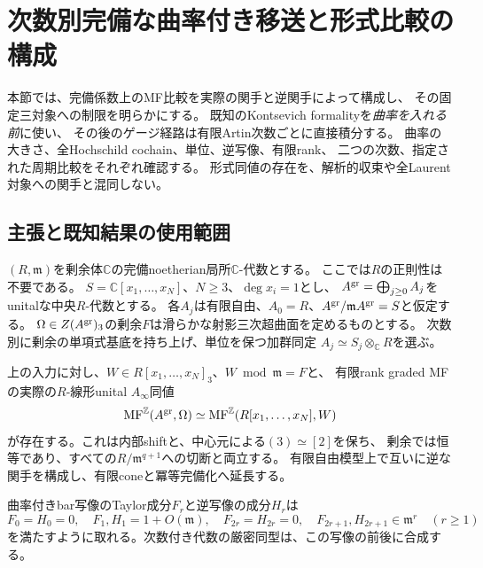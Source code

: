 \section{次数別完備な曲率付き移送と形式比較の構成}
\label{cft:sec:transport}

本節では、完備係数上のMF比較を実際の関手と逆関手によって構成し、
その固定三対象への制限を明らかにする。
既知のKontsevich formalityを\emph{曲率を入れる前}に使い、
その後のゲージ経路は有限Artin次数ごとに直接積分する。
曲率の大きさ、全Hochschild cochain、単位、逆写像、有限rank、
二つの次数、指定された周期比較をそれぞれ確認する。
形式同値の存在を、解析的収束や全Laurent対象への関手と混同しない。

\subsection{主張と既知結果の使用範囲}
$(R,\mathfrak m)$を剰余体$\mathbb C$の完備noetherian局所$\mathbb C$-代数とする。
ここでは$R$の正則性は不要である。
$S=\mathbb C[x_1,\ldots,x_N]$、$N\ge3$、$\deg x_i=1$とし、
$A^{\rm gr}=\bigoplus_{j\ge0}A_j$をunitalな中央$R$-代数とする。
各$A_j$は有限自由、$A_0=R$、$A^{\rm gr}/\mathfrak m A^{\rm gr}=S$と仮定する。
$\Omega\in Z(A^{\rm gr})_3$の剰余$F$は滑らかな射影三次超曲面を定めるものとする。
次数別に剰余の単項式基底を持ち上げ、単位を保つ加群同定
$A_j\simeq S_j\otimes_{\mathbb C}R$を選ぶ。

\begin{theorem}
\label{cft:thm:complete}
上の入力に対し、$W\in R[x_1,\ldots,x_N]_3$、$W\bmod\mathfrak m=F$と、
有限rank graded MFの実際の$R$-線形unital $A_\infty$同値
\begin{equation}\label{cft:eq:equivalence}
 \operatorname{MF}^{\mathbb Z}(A^{\rm gr},\Omega)
 \simeq\operatorname{MF}^{\mathbb Z}(R[x_1,\ldots,x_N],W)
\end{equation}
が存在する。これは内部shiftと、中心元による$(3)\simeq[2]$を保ち、
剰余では恒等であり、すべての$R/\mathfrak m^{q+1}$への切断と両立する。
有限自由模型上で互いに逆な関手を構成し、有限coneと冪等完備化へ延長する。

曲率付きbar写像のTaylor成分$F_r$と逆写像の成分$H_r$は
\begin{equation}\label{cft:eq:bound}
 F_0=H_0=0,\quad F_1,H_1=1+O(\mathfrak m),\quad
 F_{2r}=H_{2r}=0,\quad F_{2r+1},H_{2r+1}\in\mathfrak m^r\quad(r\ge1)
\end{equation}
を満たすように取れる。次数付き代数の厳密同型は、この写像の前後に合成する。
\end{theorem}

